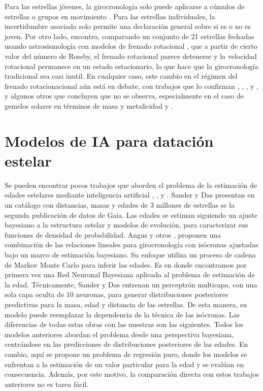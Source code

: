 Para las estrellas jóvenes, la girocronología solo puede aplicarse a cúmulos de estrellas o grupos en movimiento \cite{Curtis19}. Para las estrellas individuales, la incertidumbre asociada solo permite una declaración general sobre si es o no es joven. Por otro lado, \cite{Saders16} encontro, comparando un conjunto de 21 estrellas fechadas usando astrosismología con modelos de frenado rotacional \cite{Saders13}, que a partir de cierto valor del número de Rossby, el frenado rotacional parece detenerse y la velocidad rotacional permanece en un estado estacionario, lo que hace que la girocronología tradicional sea casi inutil. En cualquier caso, este cambio en el régimen del frenado rotacionacional aún está en debate, con trabajos que lo confirman \cite{Gordon21}, \cite{Kitchatinov17}, \cite{Metcalfe19}, \cite{Metcalfe17} y \cite{Saders19}, y algunos otros que concluyen que no se observa, especialmente en el caso de gemelos solares en términos de masa y metalicidad \cite{Barnes16} y \cite{Oliveira19}.


\section{Modelos de IA para datación estelar}
Se pueden encontrar pocos trabajos que aborden el problema de la estimación de edades estelares mediante inteligencia artificial \cite{stardate}, \cite{Angus19}, \cite{das2018} y \cite{sanders2018}. Sander y Das presentan en \cite{sanders2018} un catálogo con distancias, masas y edades de 3 millones de estrellas se la segunda publicación de datos de Gaia. Las edades se estiman siguiendo un ajuste bayesiano a la estructura estelar y modelos de evolución, para caracterizar sus funciones de densidad de probabilidad. Angus y otros \cite{stardate}, \cite{Angus19} proponen una combinación de las relaciones lineales para girocronología con isócronas ajustadas bajo un marco de estimación bayesiano. Su enfoque utiliza un proceso de cadena de Markov Monte Carlo para inferir las edades. Es en \cite{sanders2018} donde encontramos por primera vez una Red Neuronal Bayesiana aplicada al problema de estimación de la edad. Técnicamente, Sander y Das entrenan un perceptrón multicapa, con una sola capa oculta de 10 neuronas, para generar distribuciones posteriores predictivas para la masa, edad y distancia de las estrellas. De esta manera, su modelo puede reemplazar la dependencia de la técnica de las isócronas. Las diferencias de todas estas obras con las nuestras son las siguientes. Todos los modelos anteriores abordan el problema desde una perspectiva bayesiana, centrándose en las predicciones de distribuciones posteriores de las edades. En cambio, aquí se propone un problema de regresión puro, donde los modelos se enfrentan a la estimación de un valor particular para la edad y se evalúan en consecuencia. Además, por este motivo, la comparación directa con estos trabajos anteriores no es tarea fácil.



